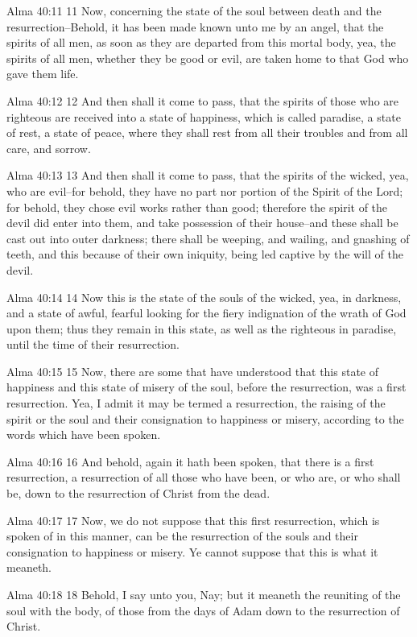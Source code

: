 Alma 40:11
 11 Now, concerning the state of the soul between death and the
resurrection--Behold, it has been made known unto me by an angel,
that the spirits of all men, as soon as they are departed from
this mortal body, yea, the spirits of all men, whether they be
good or evil, are taken home to that God who gave them life.

Alma 40:12
 12 And then shall it come to pass, that the spirits of those who
are righteous are received into a state of happiness, which is
called paradise, a state of rest, a state of peace, where they
shall rest from all their troubles and from all care, and sorrow.

Alma 40:13
 13 And then shall it come to pass, that the spirits of the
wicked, yea, who are evil--for behold, they have no part nor
portion of the Spirit of the Lord; for behold, they chose evil
works rather than good; therefore the spirit of the devil did
enter into them, and take possession of their house--and these
shall be cast out into outer darkness; there shall be weeping,
and wailing, and gnashing of teeth, and this because of their own
iniquity, being led captive by the will of the devil.

Alma 40:14
 14 Now this is the state of the souls of the wicked, yea, in
darkness, and a state of awful, fearful looking for the fiery
indignation of the wrath of God upon them; thus they remain in
this state, as well as the righteous in paradise, until the time
of their resurrection.

Alma 40:15
 15 Now, there are some that have understood that this state of
happiness and this state of misery of the soul, before the
resurrection, was a first resurrection. Yea, I admit it may be
termed a resurrection, the raising of the spirit or the soul and
their consignation to happiness or misery, according to the words
which have been spoken.

Alma 40:16
 16 And behold, again it hath been spoken, that there is a first
resurrection, a resurrection of all those who have been, or who
are, or who shall be, down to the resurrection of Christ from the
dead.

Alma 40:17
 17 Now, we do not suppose that this first resurrection, which is
spoken of in this manner, can be the resurrection of the souls
and their consignation to happiness or misery. Ye cannot suppose
that this is what it meaneth.

Alma 40:18
 18 Behold, I say unto you, Nay; but it meaneth the reuniting of
the soul with the body, of those from the days of Adam down to
the resurrection of Christ.

